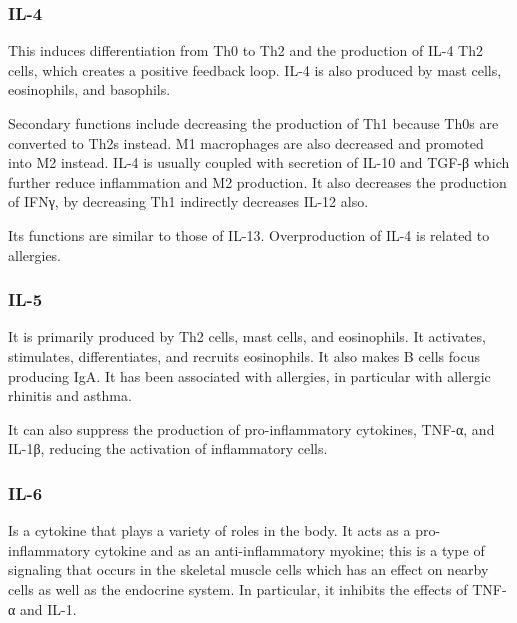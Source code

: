 

\subsubsection{IL-4}
\label{in:IL4}

This induces differentiation from Th0 to Th2 and the production of IL-4 Th2 cells, which creates a positive feedback loop. IL-4 is also produced by mast cells, eosinophils, and basophils.

Secondary functions include decreasing the production of Th1 because Th0s are converted to Th2s instead. M1 macrophages are also decreased and promoted into M2 instead. IL-4 is usually coupled with secretion of IL-10 and TGF-β which further reduce inflammation and M2 production. It also decreases the production of IFNγ, by decreasing Th1 indirectly decreases IL-12 also.

Its functions are similar to those of IL-13. Overproduction of IL-4 is related to allergies.

\subsubsection{IL-5}
\label{in:IL5}

It is primarily produced by Th2 cells, mast cells, and eosinophils. It activates, stimulates, differentiates, and recruits eosinophils. It also makes B cells focus producing IgA. It has been associated with allergies, in particular with allergic rhinitis and asthma.

It can also suppress the production of pro-inflammatory cytokines, TNF-α, and IL-1β, reducing the activation of inflammatory cells.

\subsubsection{IL-6}
\label{in:IL6}

Is a cytokine that plays a variety of roles in the body. It acts as a pro-inflammatory cytokine and as an anti-inflammatory myokine; this is a type of signaling that occurs in the skeletal muscle cells which has an effect on nearby cells as well as the endocrine system. In particular, it inhibits the effects of TNF-α and IL-1.

